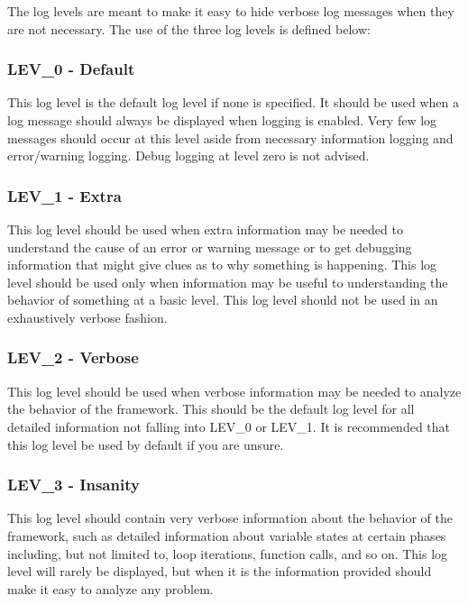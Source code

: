 \documentclass{report}
\begin{document}
\par
The log levels are meant to make it easy to hide verbose log
messages when they are not necessary.  The use of the three log
levels is defined below:

            \subsubsection{LEV\_0 - Default}

This log level is the default log level if none is specified.  It
should be used when a log message should always be displayed when
logging is enabled. Very few log messages should occur at this level
aside from necessary information logging and error/warning logging.
Debug logging at level zero is not advised.

            \subsubsection{LEV\_1 - Extra}

This log level should be used when extra information may be needed
to understand the cause of an error or warning message or to get
debugging information that might give clues as to why something is
happening.  This log level should be used only when information may
be useful to understanding the behavior of something at a basic
level.  This log level should not be used in an exhaustively verbose
fashion.

            \subsubsection{LEV\_2 - Verbose}

This log level should be used when verbose information may be needed
to analyze the behavior of the framework.  This should be the
default log level for all detailed information not falling into
LEV\_0 or LEV\_1. It is recommended that this log level be used by
default if you are unsure.

            \subsubsection{LEV\_3 - Insanity}

This log level should contain very verbose information about the
behavior of the framework, such as detailed information about variable
states at certain phases including, but not limited to, loop iterations,
function calls, and so on.  This log level will rarely be displayed,
but when it is the information provided should make it easy to analyze
any problem.
\end{document}
